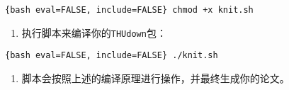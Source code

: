 \texttt{\{bash\ eval=FALSE,\ include=FALSE\}\ chmod\ +x\ knit.sh}

\begin{enumerate}
\def\labelenumi{\arabic{enumi}.}
\setcounter{enumi}{3}
\tightlist
\item
  执行脚本来编译你的\texttt{THUdown}包：
\end{enumerate}

\texttt{\{bash\ eval=FALSE,\ include=FALSE\}\ ./knit.sh}

\begin{enumerate}
\def\labelenumi{\arabic{enumi}.}
\setcounter{enumi}{4}
\tightlist
\item
  脚本会按照上述的编译原理进行操作，并最终生成你的论文。
\end{enumerate}


